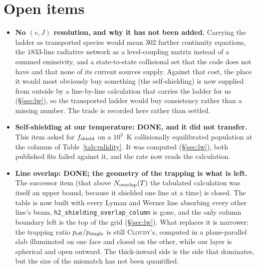\documentclass[english,a4paper]{my_memo}
\begin{document}
\section{Open items}

\begin{itemize}

\item \textbf{No $(v,J)$ resolution, and why it has not been added.} Carrying
  the ladder as transported species would mean $302$ further continuity
  equations, the $1833$-line radiative network as a level-coupling matrix
  instead of a summed emissivity, and a state-to-state collisional set that
  the code does not have and that none of its current sources supply. Against
  that cost, the place it would most obviously buy something (the
  self-shielding) is now supplied from outside by a line-by-line
  calculation that carries the ladder for us (\S\ref{sec:lw}), so the
  transported ladder would buy consistency rather than a missing number. The
  trade is recorded here rather than settled.

\item \textbf{Self-shielding at our temperature: DONE, and it did not
  transfer.} This item asked for $f_{\rm shield}$ on a $10^{3}$~K
  collisionally equilibrated population at the columns of
  Table~\ref{tab:validity}. It was computed
  (\S\ref{sec:lw}), both published fits failed against it, and the rate now
  reads the calculation.

\item \textbf{Line overlap: DONE; the geometry of the trapping is what is
  left.} The successor item (that above $N_{\rm overlap}(T)$ the tabulated
  calculation was itself an upper bound, because it shielded one line at a
  time) is closed. The table is now built with every Lyman and Werner line
  absorbing every other line's beam, \texttt{h2\_shielding\_overlap\_column}
  is gone, and the only column boundary left is the top of the grid
  (\S\ref{sec:lw}). What replaces it is narrower: the trapping ratio
  $p_{\rm eff}/p_{\rm single}$ is still \textsc{Cloudy}'s, computed in a
  plane-parallel slab illuminated on one face and closed on the other, while
  our layer is spherical and open outward. The thick-inward side is the side
  that dominates, but the size of the mismatch has not been quantified.


\end{itemize}
\end{document}
